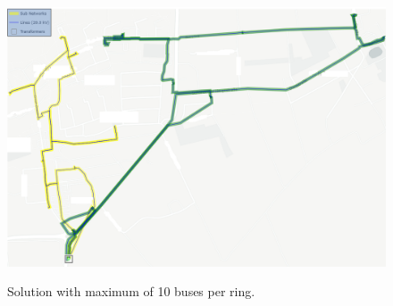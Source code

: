 \begin{figure}[h]
	\begin{centering}
		{\includegraphics[scale=0.3]{figures/experiments/ringsize/ringsize10_2.png}}
		\caption{Solution with maximum of 10 buses per ring.}
		\label{fig:ringsize10_2}
	\end{centering}
\end{figure}
